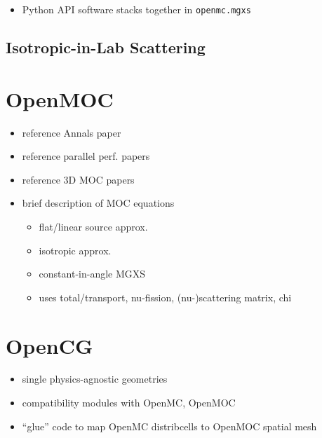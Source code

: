 \begin{itemize}[noitemsep]
  \item Python \ac{API} software stacks together in \texttt{openmc.mgxs}
\end{itemize}

\subsection{Isotropic-in-Lab Scattering}
\label{sec:chap3-iso-in-lab}


\section{OpenMOC}
\label{sec:chap3-openmoc}

\begin{itemize}[noitemsep]
  \item reference Annals paper
  \item reference parallel perf. papers
  \item reference 3D \ac{MOC} papers
  \item brief description of \ac{MOC} equations
  \begin{itemize}[noitemsep]
    \item flat/linear source approx.
    \item isotropic approx.
    \item constant-in-angle \ac{MGXS}
    \item uses total/transport, nu-fission, (nu-)scattering matrix, chi
  \end{itemize}
\end{itemize}


\section{OpenCG}
\label{sec:chap3-opencg}

\begin{itemize}[noitemsep]
  \item single physics-agnostic geometries
  \item compatibility modules with OpenMC, OpenMOC
  \item ``glue'' code to map OpenMC distribcells to OpenMOC spatial mesh
\end{itemize}

